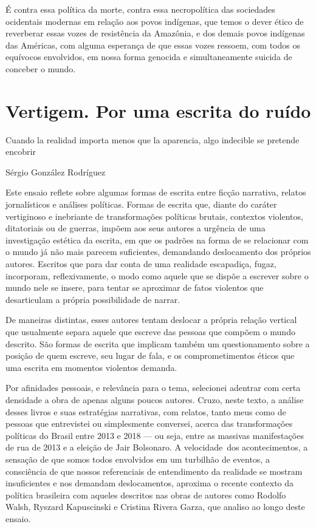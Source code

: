 É contra
essa política da morte, contra essa necropolítica das sociedades
ocidentais modernas em relação aos povos indígenas, que temos o dever
ético de reverberar essas vozes de resistência da Amazônia, e dos demais
povos indígenas das Américas, com alguma esperança de que essas vozes
ressoem, com todos os equívocos envolvidos, em nossa forma genocida e
simultaneamente suicida de conceber o mundo.

\chapter{Vertigem. Por uma escrita do ruído}

\epigraph{Cuando la realidad importa menos que la aparencia, algo indecible
se pretende encobrir}{Sérgio González Rodríguez}

Este ensaio reflete sobre algumas formas de escrita entre ficção
narrativa, relatos jornalísticos e análises políticas. Formas de escrita
que, diante do caráter vertiginoso e inebriante de transformações
políticas brutais, contextos violentos, ditatoriais ou de guerras, impõem
aos seus autores a urgência de uma investigação estética da escrita, em
que os padrões na forma de se relacionar com o mundo já não mais parecem
suficientes, demandando deslocamento dos próprios autores. Escritos que
para dar conta de uma realidade escapadiça, fugaz, incorporam,
reflexivamente, o modo como aquele que se dispõe a escrever sobre o
mundo nele se insere, para tentar se aproximar de fatos violentos que
desarticulam a própria possibilidade de narrar.

De maneiras distintas,
esses autores tentam deslocar a própria relação vertical que usualmente
separa aquele que escreve das pessoas que compõem o mundo descrito. São formas de escrita que implicam também um questionamento sobre a posição de quem escreve, seu lugar de fala, e os comprometimentos éticos que uma escrita em momentos violentos demanda.

Por afinidades pessoais, e relevância para o tema, selecionei adentrar com certa densidade a obra de apenas alguns poucos autores. Cruzo, neste texto, a análise desses livros e suas estratégias narrativas, com relatos, tanto meus como de pessoas que entrevistei ou simplesmente conversei, acerca das transformações políticas do Brasil entre 2013 e 2018 --- ou seja, entre as massivas manifestações de rua de 2013 e a eleição de Jair Bolsonaro. A velocidade dos acontecimentos, a sensação de que somos todos envolvidos em um turbilhão de eventos, a consciência de que nossos referenciais de entendimento da realidade se mostram insuficientes e nos demandam deslocamentos, aproxima o recente contexto da política brasileira com aqueles descritos nas obras de autores como Rodolfo Walsh, Ryszard Kapuscinski e Cristina Rivera Garza, que analiso ao longo deste ensaio.

